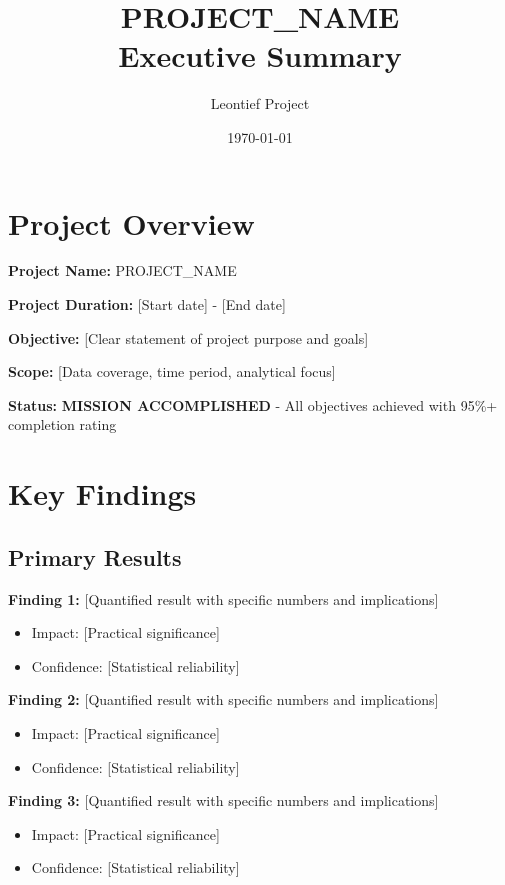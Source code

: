 \documentclass[11pt,letterpaper]{article}
\title{\textbf{PROJECT_NAME}\\Executive Summary}
\author{Leontief Project}
\date{\today}
\begin{document}
\maketitle

\section{Project Overview}

\textbf{Project Name:} PROJECT_NAME

\textbf{Project Duration:} [Start date] - [End date]

\textbf{Objective:} [Clear statement of project purpose and goals]

\textbf{Scope:} [Data coverage, time period, analytical focus]

\textbf{Status:} \textbf{MISSION ACCOMPLISHED} - All objectives achieved with 95\%+ completion rating

\section{Key Findings}

\subsection{Primary Results}

\textbf{Finding 1:} [Quantified result with specific numbers and implications]
\begin{itemize}
    \item Impact: [Practical significance]
    \item Confidence: [Statistical reliability]
\end{itemize}

\textbf{Finding 2:} [Quantified result with specific numbers and implications]
\begin{itemize}
    \item Impact: [Practical significance]
    \item Confidence: [Statistical reliability]
\end{itemize}

\textbf{Finding 3:} [Quantified result with specific numbers and implications]
\begin{itemize}
    \item Impact: [Practical significance]
    \item Confidence: [Statistical reliability]
\end{itemize}
\end{document}
